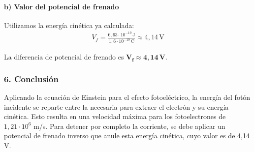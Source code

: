 \paragraph*{b) Valor del potencial de frenado}
Utilizamos la energía cinética ya calculada:
\begin{gather}
    V_f = \frac{6,63 \cdot 10^{-19} \, \text{J}}{1,6 \cdot 10^{-19} \, \text{C}} \approx 4,14 \, \text{V}
\end{gather}
\begin{cajaresultado}
    La diferencia de potencial de frenado es $\boldsymbol{V_f \approx 4,14 \, \textbf{V}}$.
\end{cajaresultado}

\subsubsection*{6. Conclusión}
\begin{cajaconclusion}
    Aplicando la ecuación de Einstein para el efecto fotoeléctrico, la energía del fotón incidente se reparte entre la necesaria para extraer el electrón y su energía cinética. Esto resulta en una velocidad máxima para los fotoelectrones de $1,21 \cdot 10^6$ m/s. Para detener por completo la corriente, se debe aplicar un potencial de frenado inverso que anule esta energía cinética, cuyo valor es de 4,14 V.
\end{cajaconclusion}
\newpage